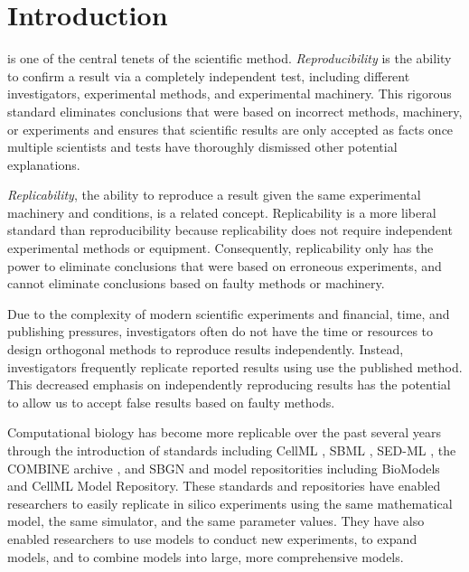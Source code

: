 \documentclass[journal,transmag,twoside]{IEEEtran}
\begin{document}
\section{Introduction}
% 
% 
% 
% 
 is one of the central tenets of the scientific method.
\textit{Reproducibility} is the ability to confirm a result via a completely independent test, including different investigators, experimental methods, and experimental machinery. 
This rigorous standard eliminates conclusions that were based on incorrect methods, machinery, or experiments and ensures that scientific results are only accepted as facts once multiple scientists and tests have thoroughly dismissed other potential explanations. 

\textit{Replicability}, the ability to reproduce a result given the same experimental machinery and conditions, is a related concept. 
Replicability is a more liberal standard than reproducibility because replicability does not require independent experimental methods or equipment.
Consequently, replicability only has the power to eliminate conclusions that were based on erroneous experiments, and cannot eliminate conclusions based on faulty methods or machinery.

Due to the complexity of modern scientific experiments and financial, time, and publishing pressures, investigators often do not have the time or resources to design orthogonal methods to reproduce results independently. Instead, investigators frequently replicate reported results using use the published method. This decreased emphasis on independently reproducing results has the potential to allow us to accept false results based on faulty methods.

Computational biology has become more replicable over the past several years through the introduction of standards including CellML \cite{cuellar2003overview}, SBML \cite{hucka2003}, SED-ML \cite{sedml2011}, the COMBINE archive \cite{COMBINE2012}, and SBGN \cite{LeNovereHMMSS09} and model repositorities including BioModels and CellML Model Repository. These standards and repositories have enabled researchers to easily replicate in silico experiments using the same mathematical model, the same simulator, and the same parameter values. They have also enabled researchers to use models to conduct new experiments, to expand models, and to combine models into large, more comprehensive models.
\end{document}
